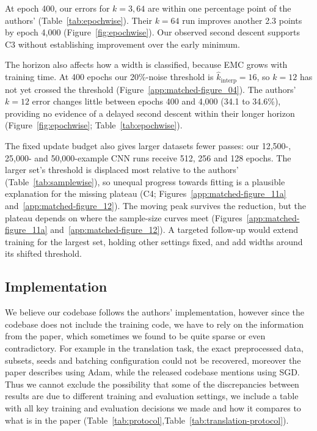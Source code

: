 \documentclass{article}
\begin{document}
At epoch 400, our errors for $k=3,64$ are within one percentage point of the authors' (Table~\ref{tab:epochwise}). Their $k=64$ run improves another 2.3 points by epoch 4,000 (Figure~\ref{fig:epochwise}). Our observed second descent supports C3 without establishing improvement over the early minimum.

The horizon also affects how a width is classified, because EMC grows with
training time. At 400 epochs our 20\%-noise threshold is
$\hat{k}_{\mathrm{interp}}=16$, so $k=12$ has not yet crossed the threshold
(Figure~\ref{app:matched-figure_04}). The authors' $k=12$ error changes
little between epochs 400 and 4,000 (34.1 to 34.6\%), providing no evidence
of a delayed second descent within their longer horizon
(Figure~\ref{fig:epochwise}; Table~\ref{tab:epochwise}).

The fixed update budget also gives larger datasets fewer passes: our
12,500-, 25,000- and 50,000-example CNN runs receive 512, 256 and 128 epochs.
The larger set's threshold is displaced most relative to the authors'
(Table~\ref{tab:samplewise}), so unequal progress towards fitting is a
plausible explanation for the missing plateau (C4;
Figures~\ref{app:matched-figure_11a} and~\ref{app:matched-figure_12}).
The moving peak survives the reduction, but the plateau depends on where
the sample-size curves meet (Figures~\ref{app:matched-figure_11a}
and~\ref{app:matched-figure_12}). A targeted follow-up would extend
training for the largest set, holding other settings fixed, and add widths
around its shifted threshold.

\subsection{Implementation}

We believe our codebase follows the authors' implementation, however since the codebase does not include the training code, we have to rely on the information from the paper, which sometimes we found to be quite sparse or even contradictory. For example in the translation task, the exact
preprocessed data, subsets, seeds and batching configuration could not be
recovered, moreover the paper describes using Adam, while the released codebase mentions using SGD. Thus we cannot exclude the possibility that some of the discrepancies between results are due to different training and evaluation settings, we include a table with all key training and evaluation decisions we made and how it compares to what is in the paper  (Table~\ref{tab:protocol},Table~\ref{tab:translation-protocol}).
\end{document}
